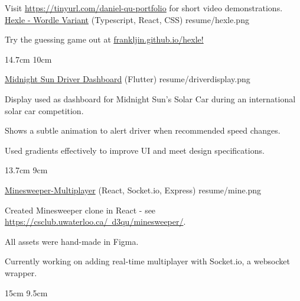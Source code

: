 

\begin{cventries}

  Visit \href{https://tinyurl.com/daniel-qu-portfolio}{\underline{https://tinyurl.com/daniel-qu-portfolio}} for short video demonstrations.
  \\%
  \portfolioEntry
    {\href{https://frankljin.github.io/hexle/}{Hexle - Wordle Variant} (Typescript, React, CSS)} %
    {resume/hexle.png} %
    {
      \begin{cvitems} %
        \item {Try the guessing game out at \href{https://frankljin.github.io/hexle/}{\underline{frankljin.github.io/hexle}!}}
      \end{cvitems}
    }
    {14.7cm}
    {10cm}

  \portfolioEntry
    {\href{https://github.com/uw-midsun/telemetry_xiv}{Midnight Sun Driver Dashboard} (Flutter)} %
    {resume/driverdisplay.png} %
    {
      \begin{cvitems} %
        \item {Display used as dashboard for Midnight Sun's Solar Car during an international solar car competition.}
        \item {Shows a subtle animation to alert driver when recommended speed changes.}
        \item {Used gradients effectively to improve UI and meet design specifications.}
      \end{cvitems}
    }
    {13.7cm}
    {9cm}

  \newpage

  \portfolioEntry
    {\href{https://csclub.uwaterloo.ca/~d3qu/minesweeper/}{Minesweeper-Multiplayer} (React, Socket.io, Express)} %
    {resume/mine.png} %
    {
      \begin{cvitems} %
        \item {Created Minesweeper clone in React - see \href{https://csclub.uwaterloo.ca/~d3qu/minesweeper/}{https://csclub.uwaterloo.ca/~d3qu/minesweeper/}.}
        \item {All assets were hand-made in Figma.}
        \item {Currently working on adding real-time multiplayer with Socket.io, a websocket wrapper.}
      \end{cvitems}
    }
    {15cm}
    {9.5cm}


\end{cventries}
